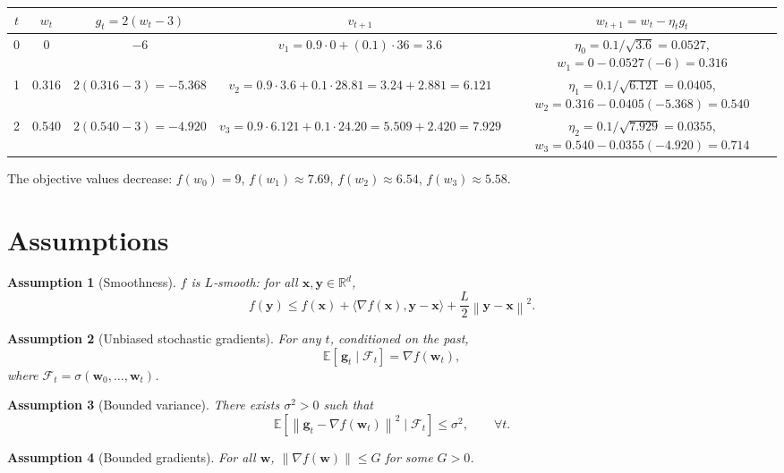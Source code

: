 \documentclass{article}
\newtheorem{assumption}{Assumption}
\newcommand{\E}{\mathbb{E}}
\newcommand{\R}{\mathbb{R}}
\newcommand{\norm}[1]{\left\|#1\right\|}
\begin{document}
\begin{center}
\begin{tabular}{c|c|c|c|c}
$t$ & $w_{t}$ & $g_{t}=2(w_{t}-3)$ & $v_{t+1}$ & $w_{t+1}=w_{t}-\eta_{t}g_{t}$ \\ \hline
0 & 0 & $-6$ & $v_{1}=0.9\cdot0+(0.1)\cdot36=3.6$ & $\eta_{0}=0.1/\sqrt{3.6}=0.0527$, $w_{1}=0-0.0527(-6)=0.316$\\
1 & 0.316 & $2(0.316-3)=-5.368$ & $v_{2}=0.9\cdot3.6+0.1\cdot28.81=3.24+2.881=6.121$ & $\eta_{1}=0.1/\sqrt{6.121}=0.0405$, $w_{2}=0.316-0.0405(-5.368)=0.540$\\
2 & 0.540 & $2(0.540-3)=-4.920$ & $v_{3}=0.9\cdot6.121+0.1\cdot24.20=5.509+2.420=7.929$ & $\eta_{2}=0.1/\sqrt{7.929}=0.0355$, $w_{3}=0.540-0.0355(-4.920)=0.714$
\end{tabular}
\end{center}
The objective values decrease: $f(w_{0})=9$, $f(w_{1})\approx7.69$, $f(w_{2})\approx6.54$, $f(w_{3})\approx5.58$.

\newpage

\section*{Assumptions}
\begin{assumption}[Smoothness]\label{as:smooth}
$f$ is $L$‑smooth: for all $\mathbf{x},\mathbf{y}\in\R^{d}$,
\[
f(\mathbf{y})\le f(\mathbf{x})+\langle\nabla f(\mathbf{x}),\mathbf{y}-\mathbf{x}\rangle+\frac{L}{2}\norm{\mathbf{y}-\mathbf{x}}^{2}.
\]
\end{assumption}

\begin{assumption}[Unbiased stochastic gradients]\label{as:unbiased}
For any $t$, conditioned on the past,
\[
\E\!\left[\,\mathbf{g}_{t}\mid\mathcal{F}_{t}\right]=\nabla f(\mathbf{w}_{t}),
\]
where $\mathcal{F}_{t}=\sigma(\mathbf{w}_{0},\dots,\mathbf{w}_{t})$.
\end{assumption}

\begin{assumption}[Bounded variance]\label{as:variance}
There exists $\sigma^{2}>0$ such that
\[
\E\!\left[\norm{\mathbf{g}_{t}-\nabla f(\mathbf{w}_{t})}^{2}\mid\mathcal{F}_{t}\right]\le\sigma^{2},\qquad\forall t.
\]
\end{assumption}

\begin{assumption}[Bounded gradients]\label{as:bound}
For all $\mathbf{w}$, $\norm{\nabla f(\mathbf{w})}\le G$ for some $G>0$.
\end{assumption}
\end{document}
